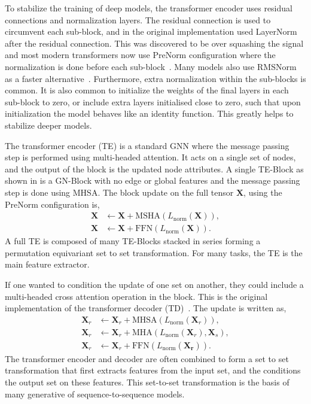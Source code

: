 To stabilize the training of deep models, the transformer encoder uses residual connections and normalization layers.
The residual connection is used to circumvent each sub-block, and in the original implementation used LayerNorm~ after the residual connection.
This was discovered to be over squashing the signal and most modern transformers now use PreNorm configuration where the normalization is done before each sub-block~.
Many models also use RMSNorm as a faster alternative~.
Furthermore, extra normalization within the sub-blocks is common.
It is also common to initialize the weights of the final layers in each sub-block to zero, or include extra layers initialised close to zero, such that upon initialization the model behaves like an identity function.
This greatly helps to stabilize deeper models.

The transformer encoder (TE) is a standard GNN where the message passing step is performed using multi-headed attention.
It acts on a single set of nodes, and the output of the block is the updated node attributes.
A single TE-Block as shown in  is a GN-Block with no edge or global features and the message passing step is done using MHSA.
The block update on the full tensor $\mathbf{X}$, using the PreNorm configuration is,
\begin{equation}
\begin{aligned}
    \mathbf{X} & \leftarrow \mathbf{X} + \text{MSHA}(L_\text{norm}(\mathbf{X})), \\
    \mathbf{X} & \leftarrow \mathbf{X} + \text{FFN}(L_\text{norm}(\mathbf{X})).
\end{aligned}
\end{equation}
A full TE is composed of many TE-Blocks stacked in series forming a permutation equivariant set to set transformation.
For many tasks, the TE is the main feature extractor.

If one wanted to condition the update of one set on another, they could include a multi-headed cross attention operation in the block.
This is the original implementation of the transformer decoder (TD)~.
The update is written as,
\begin{equation}
\begin{aligned}
    \mathbf{X}_r & \leftarrow \mathbf{X}_r + \text{MHSA}(L_\text{norm}(\mathbf{X}_r)), \\
    \mathbf{X}_r & \leftarrow \mathbf{X}_r + \text{MHA}(L_\text{norm}(\mathbf{X}_r), \mathbf{X}_s), \\
    \mathbf{X}_r & \leftarrow \mathbf{X}_r + \text{FFN}(L_\text{norm}(\mathbf{X_r})).
\end{aligned}
\end{equation}
The transformer encoder and decoder are often combined to form a set to set transformation that first extracts features from the input set, and the conditions the output set on these features.
This set-to-set transformation is the basis of many generative of sequence-to-sequence models.

